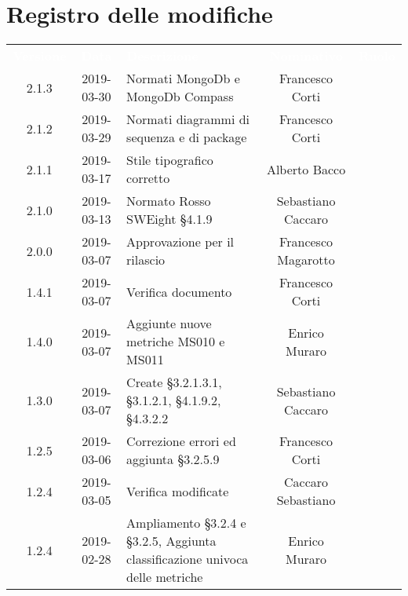 
\section*{Registro delle modifiche}
{
	\renewcommand{\arraystretch}{1.5}
	\centering
	\begin{longtable}{ c c C{4cm} c c }
		
		\textcolor{white}{\textbf{Versione}} & \textcolor{white}{\textbf{Data}} & \textcolor{white}{\textbf{Descrizione}} & \textcolor{white}{\textbf{Nominativo}} & \textcolor{white}{\textbf{Ruolo}}\\
		
		2.1.3 & 2019-03-30 & Normati MongoDb e MongoDb Compass & Francesco Corti & \reda{} \\		
		
		2.1.2 & 2019-03-29 & Normati diagrammi di sequenza e di package & Francesco Corti & \reda{} \\	
		
		2.1.1 & 2019-03-17 & Stile tipografico corretto & Alberto Bacco & \reda{} \\	
		
		2.1.0 & 2019-03-13 & Normato Rosso SWEight §4.1.9 & Sebastiano Caccaro & \reda{} \\			
		
		2.0.0 & 2019-03-07 & Approvazione per il rilascio & Francesco Magarotto & \Res{} \\		
		
		1.4.1 & 2019-03-07 & Verifica documento & Francesco Corti & \ver{} \\	
		
		1.4.0 & 2019-03-07 & Aggiunte nuove metriche MS010 e MS011 & Enrico Muraro & \reda{} \\
		
		1.3.0 & 2019-03-07 & Create §3.2.1.3.1, §3.1.2.1, §4.1.9.2, §4.3.2.2 & Sebastiano Caccaro & \reda{} \\
		
		1.2.5 & 2019-03-06 & Correzione errori ed aggiunta §3.2.5.9 & Francesco Corti & \reda{} \\
		
		1.2.4 & 2019-03-05 & Verifica modificate & Caccaro Sebastiano & \ver{} \\		
		
		1.2.4 & 2019-02-28 & Ampliamento §3.2.4 e §3.2.5, Aggiunta classificazione univoca delle metriche & Enrico Muraro & \reda{} \\
		

\end{longtable}}
